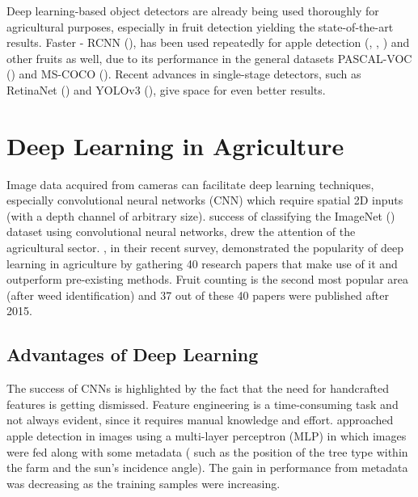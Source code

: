Deep learning-based object detectors are already being used thoroughly for agricultural purposes, especially in fruit detection yielding the state-of-the-art results. Faster - RCNN (\cite{ren2015faster}), has been used repeatedly for apple detection (\cite{sa2016deepfruits}, \cite{bargoti2017deep}, \cite{tao2018rapid}) and other fruits as well, due to its performance in the general datasets PASCAL-VOC (\cite{everingham2010pascal}) and MS-COCO (\cite{lin2014microsoft}). Recent advances in single-stage detectors, such as RetinaNet (\cite{lin2017focal}) and YOLOv3 (\cite{redmon2018yolov3}), give space for even better results.

\section{Deep Learning in Agriculture}
Image data acquired from cameras can facilitate deep learning techniques, especially convolutional neural networks (CNN) which require spatial 2D inputs (with a depth channel of arbitrary size). \cite{krizhevsky2012imagenet} success of classifying the ImageNet (\cite{deng2009imagenet}) dataset using convolutional neural networks, drew the attention of the agricultural sector. \cite{kamilaris2018deep}, in their recent survey, demonstrated the popularity of deep learning in agriculture by gathering 40 research papers that make use of it and outperform pre-existing methods. Fruit counting is the second most popular area (after weed identification) and 37 out of these 40 papers were published after 2015. 

\subsection{Advantages of Deep Learning}
The success of CNNs is highlighted by the fact that the need for handcrafted features is getting dismissed. Feature engineering is a time-consuming task and not always evident, since it requires manual knowledge and effort. \cite{bargoti2016image} approached apple detection in images using a multi-layer perceptron (MLP) in which images were fed along with some metadata ( such as the position of the tree type within the farm and the sun's incidence angle). The gain in performance from metadata was decreasing as the training samples were increasing. 


